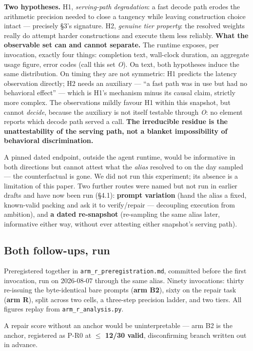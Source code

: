 \textbf{Two hypotheses.} H1, \emph{serving-path degradation}: a fast decode path erodes the arithmetic precision needed to close a tangency while leaving construction choice intact --- precisely \S3's signature. H2, \emph{genuine tier property}: the resolved weights really do attempt harder constructions and execute them less reliably. \textbf{What the observable set can and cannot separate.} The runtime exposes, per invocation, exactly four things: completion text, wall-clock duration, an aggregate usage figure, error codes (call this set \emph{O}). On text, both hypotheses induce the same distribution. On timing they are not symmetric: H1 predicts the latency observation directly; H2 needs an auxiliary --- ``a fast path was in use but had no behavioral effect'' --- which is H1's mechanism minus its causal claim, strictly more complex. The observations mildly favour H1 within this snapshot, but cannot \emph{decide}, because the auxiliary is not itself testable through \emph{O}: no element reports which decode path served a call. \textbf{The irreducible residue is the unattestability of the serving path, not a blanket impossibility of behavioral discrimination.}

A pinned dated endpoint, outside the agent runtime, would be informative in both directions but cannot attest what the \emph{alias} resolved to on the day sampled --- the counterfactual is gone. We did not run this experiment; its absence is a limitation of this paper. Two further routes were named but not run in earlier drafts and have now been run (\S4.1): \textbf{prompt variation} (hand the alias a fixed, known-valid packing and ask it to verify/repair --- decoupling execution from ambition), and \textbf{a dated re-snapshot} (re-sampling the same alias later, informative either way, without ever attesting either snapshot's serving path).

\subsection{Both follow-ups, run}

Preregistered together in \texttt{arm\_r\_preregistration.md}, committed before the first invocation, run on 2026-08-07 through the same alias. Ninety invocations: thirty re-issuing the byte-identical bare prompts (\textbf{arm B2}), sixty on the repair task (\textbf{arm R}), split across two cells, a three-step precision ladder, and two tiers. All figures replay from \texttt{arm\_r\_analysis.py}.

A repair score without an anchor would be uninterpretable --- arm B2 is the anchor, registered as P-R0 at \textbf{$\le$ 12/30 valid}, disconfirming branch written out in advance.

